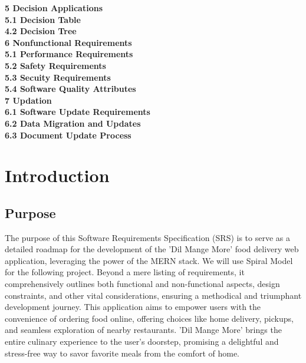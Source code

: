 \documentclass{article}
\begin{document}
\textbf{5 Decision Applications} \\
\hspace*{10mm}\textbf{5.1 Decision Table } \\
\hspace*{10mm}\textbf{4.2 Decision Tree } \\


\textbf{6 Nonfunctional Requirements } \\
\hspace*{10mm}\textbf{5.1 Performance Requirements } \\
\hspace*{10mm}\textbf{5.2 Safety Requirements } \\
\hspace*{10mm}\textbf{5.3 Secuity Requirements } \\
\hspace*{10mm}\textbf{5.4 Software Quality Attributes} \\

\textbf{7 Updation } \\
\hspace*{10mm}\textbf{6.1 Software Update Requirements } \\
\hspace*{10mm}\textbf{6.2 Data Migration and Updates } \\
\hspace*{10mm}\textbf{6.3 Document Update Process } \\
\newpage

\section{Introduction}
\subsection{Purpose}
The purpose of this Software Requirements Specification (SRS) is to serve as a detailed roadmap for the development of the 'Dil Mange More' food delivery web application, leveraging the power of the MERN stack. We will use Spiral Model for the following project. Beyond a mere listing of requirements, it comprehensively outlines both functional and non-functional aspects, design constraints, and other vital considerations, ensuring a methodical and triumphant development journey. This application aims to empower users with the convenience of ordering food online, offering choices like home delivery, pickups, and seamless exploration of nearby restaurants. 'Dil Mange More' brings the entire culinary experience to the user's doorstep, promising a delightful and stress-free way to savor favorite meals from the comfort of home.
\end{document}
